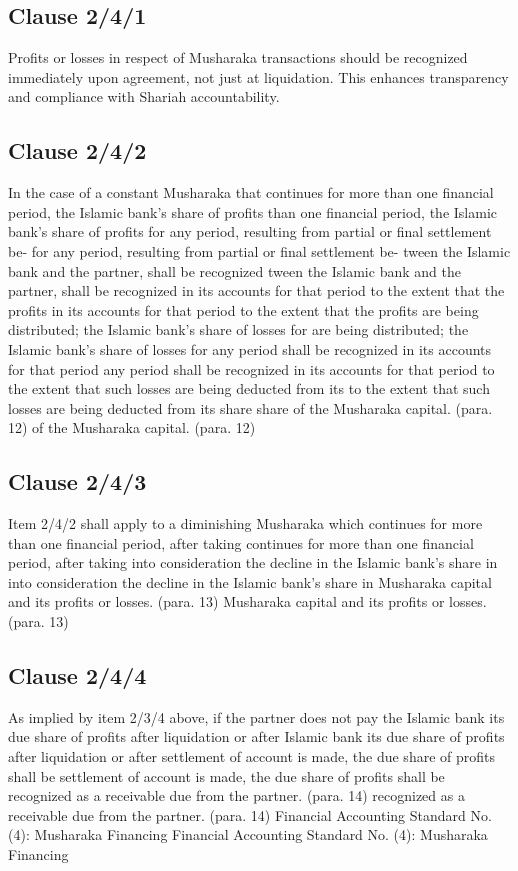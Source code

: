 \documentclass{article}%
\begin{document}
%
\subsection{Clause 2/4/1}%
\label{subsec:Clause2/4/1}%
Profits or losses in respect of Musharaka transactions should be recognized immediately upon agreement, not just at liquidation. This enhances transparency and compliance with Shariah accountability.

%
\subsection{Clause 2/4/2}%
\label{subsec:Clause2/4/2}%
In the case of a constant Musharaka that continues for more  than one financial period, the Islamic bank’s share of profits  than one financial period, the Islamic bank’s share of profits  for any period, resulting from partial or final settlement be- for any period, resulting from partial or final settlement be- tween the Islamic bank and the partner, shall be recognized  tween the Islamic bank and the partner, shall be recognized  in its accounts for that period to the extent that the profits  in its accounts for that period to the extent that the profits  are being distributed; the Islamic bank’s share of losses for  are being distributed; the Islamic bank’s share of losses for  any period shall be recognized in its accounts for that period  any period shall be recognized in its accounts for that period  to the extent that such losses are being deducted from its  to the extent that such losses are being deducted from its share  share  of the Musharaka capital. (para. 12) of the Musharaka capital. (para. 12)

%
\subsection{Clause 2/4/3}%
\label{subsec:Clause2/4/3}%
Item 2/4/2 shall apply to a diminishing Musharaka which  continues for more than one financial period, after taking  continues for more than one financial period, after taking  into consideration the decline in the Islamic bank’s share in  into consideration the decline in the Islamic bank’s share in  Musharaka capital and its profits or losses. (para. 13) Musharaka capital and its profits or losses. (para. 13)

%
\subsection{Clause 2/4/4}%
\label{subsec:Clause2/4/4}%
As implied by item 2/3/4 above, if the partner does not pay the  Islamic bank its due share of profits after liquidation or after  Islamic bank its due share of profits after liquidation or after  settlement of account is made, the due share of profits shall be  settlement of account is made, the due share of profits shall be  recognized as a receivable due from the partner. (para. 14) recognized as a receivable due from the partner. (para. 14) Financial Accounting Standard No. (4): Musharaka Financing Financial Accounting Standard No. (4): Musharaka Financing
\end{document}
